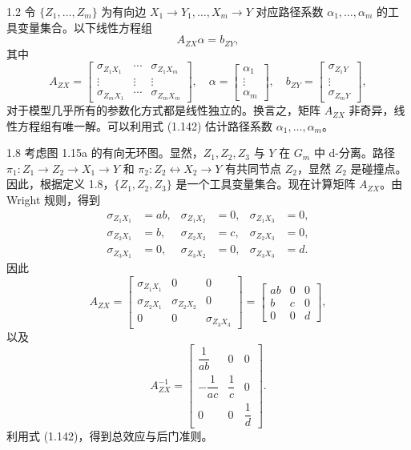 \begin{booktheorem}{1.2}
令 $\{Z_1,\ldots,Z_m\}$ 为有向边 $X_1\to Y_1,\ldots,X_m\to Y$ 对应路径系数 $\alpha_1,\ldots,\alpha_m$ 的工具变量集合。以下线性方程组
\begin{equation}
A_{ZX}\alpha=b_{ZY},
\tag{1.142}
\end{equation}
其中
\[
A_{ZX}=
\begin{bmatrix}
\sigma_{Z_1X_1}&\cdots&\sigma_{Z_1X_m}\\
\vdots&\vdots&\vdots\\
\sigma_{Z_mX_1}&\cdots&\sigma_{Z_mX_m}
\end{bmatrix},
\quad
\alpha=\begin{bmatrix}\alpha_1\\\vdots\\\alpha_m\end{bmatrix},
\quad
b_{ZY}=\begin{bmatrix}\sigma_{Z_1Y}\\\vdots\\\sigma_{Z_mY}\end{bmatrix},
\]
对于模型几乎所有的参数化方式都是线性独立的。换言之，矩阵 $A_{ZX}$ 非奇异，线性方程组有唯一解。可以利用式 (1.142) 估计路径系数 $\alpha_1,\ldots,\alpha_m$。
\end{booktheorem}

\begin{bookexample}{1.8}
考虑图 1.15a 的有向无环图。显然，$Z_1,Z_2,Z_3$ 与 $Y$ 在 $G_m$ 中 d-分离。路径 $\pi_1:Z_1\to Z_2\to X_1\to Y$ 和 $\pi_2:Z_2\leftrightarrow X_2\to Y$ 有共同节点 $Z_2$，显然 $Z_2$ 是碰撞点。因此，根据定义 1.8，$\{Z_1,Z_2,Z_3\}$ 是一个工具变量集合。现在计算矩阵 $A_{ZX}$。由 Wright 规则，得到
\[
\begin{aligned}
\sigma_{Z_1X_1}&=ab,&
\sigma_{Z_1X_2}&=0,&
\sigma_{Z_1X_3}&=0,\\
\sigma_{Z_2X_1}&=b,&
\sigma_{Z_2X_2}&=c,&
\sigma_{Z_2X_3}&=0,\\
\sigma_{Z_3X_1}&=0,&
\sigma_{Z_3X_2}&=0,&
\sigma_{Z_3X_3}&=d.
\end{aligned}
\]
因此
\[
A_{ZX}=
\begin{bmatrix}
\sigma_{Z_1X_1}&0&0\\
\sigma_{Z_2X_1}&\sigma_{Z_2X_2}&0\\
0&0&\sigma_{Z_3X_3}
\end{bmatrix}
=\begin{bmatrix}
ab&0&0\\
b&c&0\\
0&0&d
\end{bmatrix},
\]
以及
\[
A_{ZX}^{-1}=
\begin{bmatrix}
\dfrac1{ab}&0&0\\[4pt]
-\dfrac1{ac}&\dfrac1c&0\\[4pt]
0&0&\dfrac1d
\end{bmatrix}.
\]
利用式 (1.142)，得到总效应与后门准则。
\end{bookexample}

